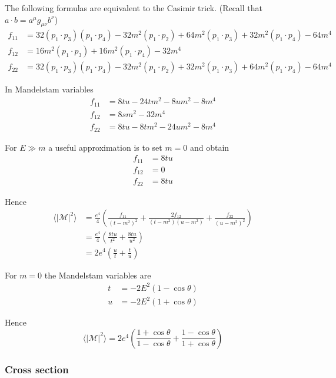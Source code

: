 The following formulas are equivalent to the Casimir trick.
(Recall that $a\cdot b=a^\mu g_{\mu\nu}b^\nu$)
\begin{align*}
f_{11}&=
 32 (p_1 \cdot p_3) (p_1 \cdot p_4) -
 32 m^2 (p_1 \cdot p_2) +
 64 m^2 (p_1 \cdot p_3) +
 32 m^2 (p_1 \cdot p_4) - 64 m^4
\\
f_{12}&=
 16 m^2 (p_1 \cdot p_3) +
 16 m^2 (p_1 \cdot p_4) - 32 m^4
\\
f_{22}&=
 32 (p_1 \cdot p_3) (p_1 \cdot p_4) -
 32 m^2 (p_1 \cdot p_2) +
 32 m^2 (p_1 \cdot p_3) +
 64 m^2 (p_1 \cdot p_4) - 64 m^4
\end{align*}

In Mandelstam variables
\begin{align*}
f_{11}&=8 t u - 24 t m^2 - 8 u m^2 - 8 m^4
\\
f_{12}&=8 s m^2 - 32 m^4
\\
f_{22}&=8 t u - 8 t m^2 - 24 u m^2 - 8 m^4
\end{align*}

For $E\gg m$ a useful approximation is to set $m=0$ and obtain
\begin{align*}
f_{11}&=8tu
\\
f_{12}&=0
\\
f_{22}&=8tu
\end{align*}

Hence
\begin{align*}
\langle|\mathcal{M}|^2\rangle
&=\frac{e^4}{4}
\left(
\frac{f_{11}}{(t-m^2)^2}
+\frac{2f_{12}}{(t-m^2)(u-m^2)}
+\frac{f_{22}}{(u-m^2)^2}
\right)
\\
&=\frac{e^4}{4}
\left(
\frac{8tu}{t^2}
+\frac{8tu}{u^2}
\right)
\\
&=2e^4
\left(
\frac{u}{t}
+\frac{t}{u}
\right)
\end{align*}

For $m=0$ the Mandelstam variables are
\begin{align*}
t&=-2E^2(1-\cos\theta)
\\
u&=-2E^2(1+\cos\theta)
\end{align*}

Hence
\begin{equation*}
\langle|\mathcal{M}|^2\rangle
=2e^4\left(
\frac{1+\cos\theta}{1-\cos\theta}+
\frac{1-\cos\theta}{1+\cos\theta}
\right)
\end{equation*}

\subsubsection*{Cross section}


